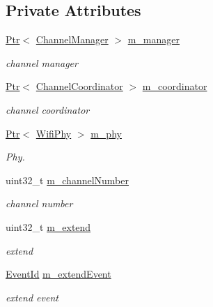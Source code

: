 \subsection*{Private Attributes}
\begin{DoxyCompactItemize}
\item 
\hyperlink{classns3_1_1Ptr}{Ptr}$<$ \hyperlink{classns3_1_1ChannelManager}{Channel\+Manager} $>$ \hyperlink{classns3_1_1DefaultChannelScheduler_a14293f27890ec1e16183936743dbb95b}{m\+\_\+manager}
\begin{DoxyCompactList}\small\item\em channel manager \end{DoxyCompactList}\item 
\hyperlink{classns3_1_1Ptr}{Ptr}$<$ \hyperlink{classns3_1_1ChannelCoordinator}{Channel\+Coordinator} $>$ \hyperlink{classns3_1_1DefaultChannelScheduler_a75891fa9160464561c9a74381f7238f4}{m\+\_\+coordinator}
\begin{DoxyCompactList}\small\item\em channel coordinator \end{DoxyCompactList}\item 
\hyperlink{classns3_1_1Ptr}{Ptr}$<$ \hyperlink{classns3_1_1WifiPhy}{Wifi\+Phy} $>$ \hyperlink{classns3_1_1DefaultChannelScheduler_ae255b2ebc5808dec8d3c09bac8819d7b}{m\+\_\+phy}
\begin{DoxyCompactList}\small\item\em Phy. \end{DoxyCompactList}\item 
uint32\+\_\+t \hyperlink{classns3_1_1DefaultChannelScheduler_ade2b5b6a517ae8cfaf6c476c422d0d41}{m\+\_\+channel\+Number}
\begin{DoxyCompactList}\small\item\em channel number \end{DoxyCompactList}\item 
uint32\+\_\+t \hyperlink{classns3_1_1DefaultChannelScheduler_a3a9b84c45c27a713bb2e9842a0b69992}{m\+\_\+extend}
\begin{DoxyCompactList}\small\item\em extend \end{DoxyCompactList}\item 
\hyperlink{classns3_1_1EventId}{Event\+Id} \hyperlink{classns3_1_1DefaultChannelScheduler_a4310bf1dbbb3dd6994241ea2e8bde086}{m\+\_\+extend\+Event}
\begin{DoxyCompactList}\small\item\em extend event \end{DoxyCompactList}\item 

\end{DoxyCompactItemize}
